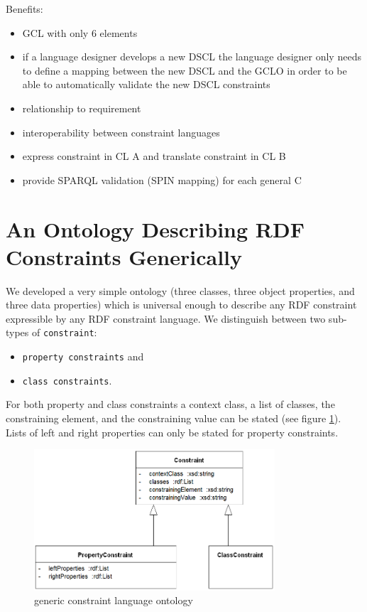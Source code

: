 \documentclass{llncs}
\newcommand{\ms}[1]{\texttt{#1}}
\begin{document}
Benefits:
\begin{itemize}
	\item GCL with only 6 elements
	\item if a language designer develops a new DSCL the language designer only needs to define a mapping between the new DSCL and the GCLO 
	in order to be able to automatically validate the new DSCL constraints
\end{itemize}

\begin{itemize}
	\item relationship to requirement
	\item interoperability between constraint languages
  \item express constraint in CL A and translate constraint in CL B
  \item provide SPARQL validation (SPIN mapping) for each general C 
\end{itemize}

\section{An Ontology Describing RDF Constraints Generically} 

We developed a very simple ontology (three classes, three object properties, and three data properties) which is universal enough to describe any RDF constraint expressible by any RDF constraint language.
We distinguish between two sub-types of \ms{constraint}: 
\begin{itemize}
	\item \ms{property constraints} and 
	\item \ms{class constraints}. 
\end{itemize}

For both property and class constraints a context class, a list of classes, the constraining element, and the constraining value can be stated
(see figure \ref{fig:generic-constraint-language-ontology}). Lists of left and right properties can only be stated for property constraints.

\begin{figure}
	\centering
		\includegraphics[width=0.80\textwidth]{images/generic-constraint-language-ontology.png}
	\caption{generic constraint language ontology}
	\label{fig:generic-constraint-language-ontology}
\end{figure}
\end{document}

